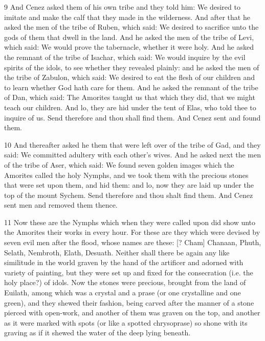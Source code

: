 \par 9 And Cenez asked them of his own tribe and they told him: We desired to imitate and make the calf that they made in the wilderness. And after that he asked the men of the tribe of Ruben, which said: We desired to sacrifice unto the gods of them that dwell in the land. And he asked the men of the tribe of Levi, which said: We would prove the tabernacle, whether it were holy. And he asked the remnant of the tribe of Isachar, which said: We would inquire by the evil spirits of the idols, to see whether they revealed plainly: and he asked the men of the tribe of Zabulon, which said: We desired to eat the flesh of our children and to learn whether God hath care for them. And he asked the remnant of the tribe of Dan, which said: The Amorites taught us that which they did, that we might teach our children. And lo, they are hid under the tent of Elas, who told thee to inquire of us. Send therefore and thou shall find them. And Cenez sent and found them. 

\par 10 And thereafter asked he them that were left over of the tribe of Gad, and they said: We committed adultery with each other's wives. And he asked next the men of the tribe of Aser, which said: We found seven golden images which the Amorites called the holy Nymphs, and we took them with the precious stones that were set upon them, and hid them: and lo, now they are laid up under the top of the mount Sychem. Send therefore and thou shalt find them. And Cenez sent men and removed them thence. 

\par 11 Now these are the Nymphs which when they were called upon did show unto the Amorites their works in every hour. For these are they which were devised by seven evil men after the flood, whose names are these: [? Cham] Chanaan, Phuth, Selath, Nembroth, Elath, Desuath. Neither shall there be again any like similitude in the world graven by the hand of the artificer and adorned with variety of painting, but they were set up and fixed for the consecration (i.e. the holy place?) of idols. Now the stones were precious, brought from the land of Euilath, among which was a crystal and a prase (or one crystalline and one green), and they shewed their fashion, being carved after the manner of a stone pierced with open-work, and another of them was graven on the top, and another as it were marked with spots (or like a spotted chrysoprase) so shone with its graving as if it shewed the water of the deep lying beneath.

